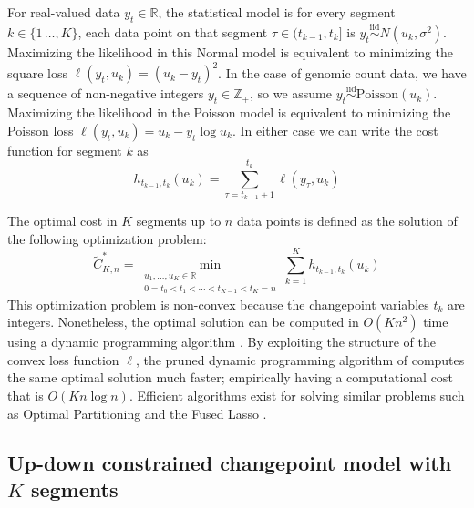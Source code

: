 \documentclass[twoside,11pt]{article}
\newcommand{\ZZ}{\mathbb Z}
\newcommand{\RR}{\mathbb R}
\begin{document}
For real-valued data $y_t\in\RR$, the statistical model is for every
segment $k\in\{1\,\dots,K\}$, each data point on that segment
$\tau\in(t_{k-1},t_k]$ is
$y_t\stackrel{\text{iid}}{\sim}N(u_k,\sigma^2)$.  Maximizing the
likelihood in this Normal model is equivalent to minimizing the square
loss $\ell(y_t,u_k)=(u_k-y_t)^2$. In the case of genomic count data,
we have a sequence of non-negative integers $y_t\in\ZZ_+$, so we
assume $y_t\stackrel{\text{iid}}{\sim}\text{Poisson}(u_k)$.
Maximizing the likelihood in the Poisson model is equivalent to
minimizing the Poisson loss $\ell(y_t,u_k)=u_k-y_t\log u_k$. In either
case we can write the cost function for segment $k$ as
\begin{equation}
  \label{eq:h}
  h_{t_{k-1}, t_k}(u_k) = \sum_{\tau=t_{k-1}+1}^{t_k} \ell(y_\tau, u_k)
\end{equation}

The optimal cost in $K$ segments up to $n$ data points
is defined as the solution of the following optimization problem:
\begin{equation}
  \label{eq:segment-neighborhood}
\tilde{C}^*_{K,n} = \min_{\substack{
u_1,\dots, u_{K}\in\RR
\\
0=t_0<t_1<\cdots<t_{K-1}<t_K=n
}}
  \sum_{k=1}^K
h_{t_{k-1}, t_k}(u_k)
\end{equation}
This optimization problem is non-convex because the changepoint
variables $t_k$ are integers. Nonetheless, the optimal solution can be
computed in $O(K n^2)$ time using a dynamic programming algorithm
\citep{segment-neighborhood}. By exploiting the structure of the
convex loss function $\ell$, the pruned dynamic programming algorithm
of \citet{pruned-dp} computes the same optimal solution much faster;
empirically having a computational cost that is $O(K n \log n)$.
Efficient algorithms exist for solving similar problems such
as Optimal Partitioning
\citep{optimal-partitioning,phd-johnson,pelt,fpop} and the Fused Lasso
\citep{flsa}.


\subsection{Up-down constrained changepoint model with $K$ segments}
\end{document}
